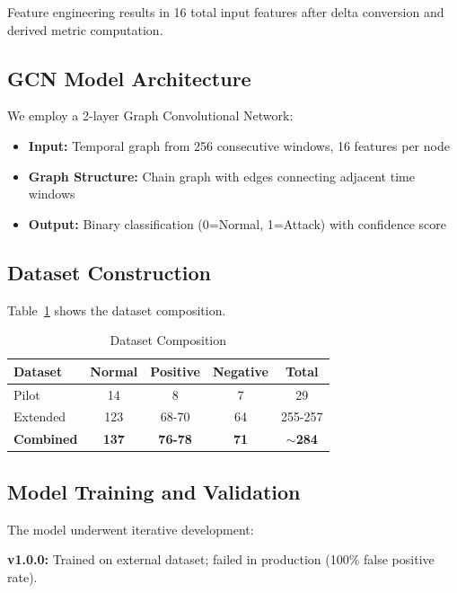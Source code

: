 \documentclass[12pt,a4paper]{article}
\begin{document}
Feature engineering results in 16 total input features after delta conversion and derived metric computation.

\subsection{GCN Model Architecture}

We employ a 2-layer Graph Convolutional Network:

\begin{itemize}
    \item \textbf{Input:} Temporal graph from 256 consecutive windows, 16 features per node
    \item \textbf{Graph Structure:} Chain graph with edges connecting adjacent time windows
    \item \textbf{Output:} Binary classification (0=Normal, 1=Attack) with confidence score
\end{itemize}

\subsection{Dataset Construction}

Table~\ref{tab:dataset} shows the dataset composition.

\begin{table}[htbp]
\centering
\caption{Dataset Composition}
\label{tab:dataset}
\begin{tabular}{@{}lcccc@{}}
\toprule
\textbf{Dataset} & \textbf{Normal} & \textbf{Positive} & \textbf{Negative} & \textbf{Total} \\
\midrule
Pilot & 14 & 8 & 7 & 29 \\
Extended & 123 & 68-70 & 64 & 255-257 \\
\midrule
\textbf{Combined} & \textbf{137} & \textbf{76-78} & \textbf{71} & \textbf{$\sim$284} \\
\bottomrule
\end{tabular}
\end{table}

\subsection{Model Training and Validation}

The model underwent iterative development:

\textbf{v1.0.0:} Trained on external dataset; failed in production (100\% false positive rate).
\end{document}
